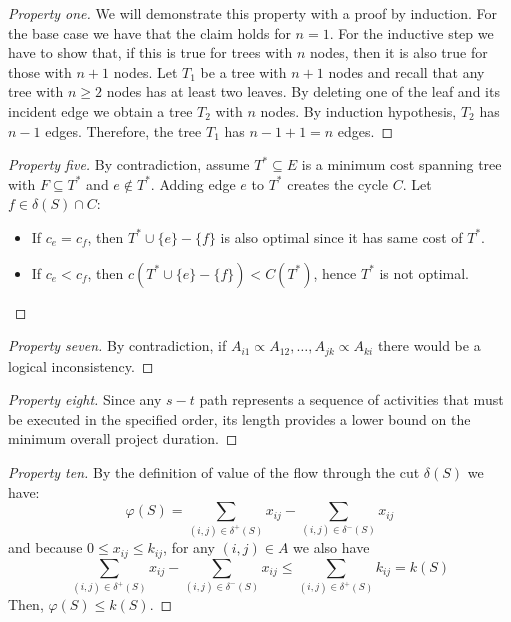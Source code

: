 \documentclass[12pt, a4paper]{report}
\begin{document}
    \begin{proof}[Property one]
        We will demonstrate this property with a proof by induction. For the base case we have that the claim holds for $n=1$. 
        For the inductive step we have to show that, if this is true for trees with $n$ nodes, then it is also true for those with $n+1$ nodes. 
        Let $T_1$ be a tree with $n+1$ nodes and recall that any tree with $n \geq 2$ nodes has at least two leaves. By deleting one of the leaf and its incident edge we obtain
        a tree $T_2$ with $n$ nodes. By induction hypothesis, $T_2$ has $n-1$ edges. Therefore, the tree $T_1$ has $n-1+1=n$ edges. 
    \end{proof}
    \begin{proof}[Property five]
        By contradiction, assume $T^{*} \subseteq E$ is a minimum cost spanning tree with $F \subseteq T^{*}$ and $e \notin T^{*}$. Adding edge $e$ to $T^{*}$ creates the cycle
        $C$. Let $f \in \delta(S) \cap C$: 
        \begin{itemize}
            \item If $c_e=c_f$, then $T^{*}\cup\{e\}-\{f\}$ is also optimal since it has same cost of $T^{*}$.
            \item If $c_e<c_f$, then $c\left(T^{*}\cup\{e\}-\{f\}\right)<C(T^{*})$, hence $T^{*}$ is not optimal.
        \end{itemize}
    \end{proof}
    \begin{proof}[Property seven]
        By contradiction, if $A_{i1} \varpropto A_{12},\dots,A_{jk} \varpropto A_{ki}$ there would be a logical inconsistency. 
    \end{proof}  
    \begin{proof}[Property eight]
        Since any $s-t$ path represents a sequence of activities that must be executed in the specified order, its length provides a lower bound on the minimum overall
        project duration. 
    \end{proof}  
    \begin{proof}[Property ten]
        By the definition of value of the flow through the cut $\delta(S)$ we have:
        \[\varphi(S)=\sum_{(i,j) \in \delta^{+}(S)}x_{ij}-\sum_{(i,j) \in \delta^{-}(S)}x_{ij}\]
        and because $0 \leq x_{ij } \leq k_{ij}$, for any $(i, j) \in A$ we also have
        \[\sum_{(i,j) \in \delta^{+}(S)}x_{ij}-\sum_{(i,j) \in \delta^{-}(S)}x_{ij} \leq \sum_{(i,j) \in \delta^{+}(S)}k_{ij}=k(S)\]
        Then, $\varphi(S) \leq k(S)$.
    \end{proof}  
\end{document}
